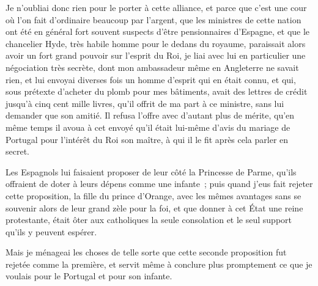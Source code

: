\documentclass[french,twoside]{book} %
\begin{document}
Je n’oubliai donc rien pour le porter à cette alliance, et parce que c’est une cour où l’on fait d’ordinaire beaucoup par l’argent, que les ministres de cette nation ont été en général fort souvent suspects d’être pensionnaires d’Espagne, et que le chancelier Hyde, très habile homme pour le dedans du royaume, paraissait alors avoir un fort grand pouvoir sur l’esprit du Roi, je liai avec lui en particulier une négociation très secrète, dont mon ambassadeur même en Angleterre ne savait rien, et lui envoyai diverses fois un homme d’esprit qui en était connu, et qui, sous prétexte d’acheter du plomb pour mes bâtiments, avait des lettres de crédit jusqu’à cinq cent mille livres, qu’il offrit de ma part à ce ministre, sans lui demander que son amitié. Il refusa l’offre avec d’autant plus de mérite, qu’en même temps il avoua à cet envoyé qu’il était lui-même d’avis du mariage de Portugal pour l’intérêt du Roi son maître, à qui il le fit après cela parler en secret.\par
Les Espagnols lui faisaient proposer de leur côté la Princesse de Parme, qu’ils offraient de doter à leurs dépens comme une infante ; puis quand j’eus fait rejeter cette proposition, la fille du prince d’Orange, avec les mêmes avantages sans se souvenir alors de leur grand zèle pour la foi, et que donner à cet État une reine protestante, était ôter aux catholiques la seule consolation et le seul support qu’ils y peuvent espérer.\par
Mais je ménageai les choses de telle sorte que cette seconde proposition fut rejetée comme la première, et servit même à conclure plus promptement ce que je voulais pour le Portugal et pour son infante.
\end{document}
